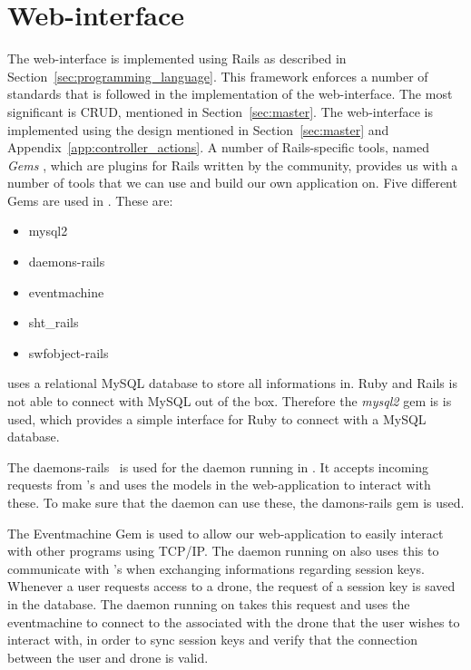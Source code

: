 

\section{Web-interface}
The web-interface is implemented using Rails as described in Section~\ref{sec:programming_language}.
This framework enforces a number of standards that is followed in the implementation of the web-interface.
The most significant is CRUD, mentioned in Section~\ref{sec:master}.
The web-interface is implemented using the design mentioned in Section~\ref{sec:master} and Appendix~\ref{app:controller_actions}.
A number of Rails-specific tools, named \emph{Gems} \citep{Rails_Gems}, which are plugins for Rails written by the community, provides us with a number of tools that we can use and build our own application on. 
Five different Gems are used in \projectname{}. 
These are: \\

\begin{itemize}
	\item mysql2
	\item daemons-rails
	\item eventmachine
	\item sht\_rails
	\item swfobject-rails
\end{itemize}

\projectname{} uses a relational MySQL database to store all informations in.
Ruby and Rails is not able to connect with MySQL out of the box. 
Therefore the \emph{mysql2} \citep{Rails_mysql2} gem is is used, which provides a simple interface for Ruby to connect with a MySQL database.

The daemons-rails \citep{Rails_daemons_rails} is used for the daemon running in . 
It accepts incoming requests from 's and uses the models in the web-application to interact with these.
To make sure that the daemon can use these, the damons-rails gem is used.

The Eventmachine Gem \citep{Rails_eventmachine} is used to allow our web-application to easily interact with other programs using TCP/IP.
The daemon running on  also uses this to communicate with 's when exchanging informations regarding session keys. 
Whenever a user requests access to a drone, the request of a session key is saved in the database. 
The daemon running on  takes this request and uses the eventmachine to connect to the  associated with the drone that the user wishes to interact with, in order to sync session keys and verify that the connection between the user and drone is valid. 

